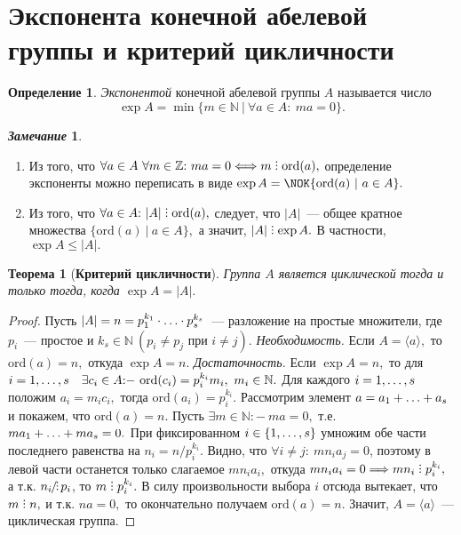 \documentclass[a4paper, 14pt]{extarticle}
\newcommand{\integers}{\mathbb{Z}}
\newcommand{\naturals}{\mathbb{N}}
\newcommand{\ord}{\mathrm{ord}}
\newcommand{\suchthat}{{:}{-} \ }
\DeclareRobustCommand{\divby}{%
	\mathrel{\text{\vbox{\baselineskip.65ex\lineskiplimit0pt\hbox{.}\hbox{.}\hbox{.}}}}%
}
\DeclareRobustCommand{\ndivby}{%
	\mathrel{\text{%
			\vbox{\baselineskip.65ex\lineskiplimit0pt\hbox{.}\hbox{.}\hbox{.}}%
			\kern-1.5ex\hbox{/}%
	}}%
}
\theoremstyle{definition}
\newtheorem*{remark}{\textit{Замечание}}
\newtheorem*{definition*}{Определение}
\theoremstyle{plain}
\newtheorem*{theorem*}{Теорема}
\numberwithin{theorem}{section}
\numberwithin{definition}{section}
\numberwithin{statement}{section}
\numberwithin{lemma}{section}
\numberwithin{consequence}{section}
\begin{document}
	\section{Экспонента конечной абелевой группы и критерий цикличности}
		\begin{definition*}
			\textit{Экспонентой} конечной абелевой группы $A$ называется число
			\begin{equation*}
				\exp A =\min \{m \in \naturals \ | \ \forall a \in A{:} \ ma = 0\}.
			\end{equation*}
		\end{definition*}
		\begin{remark}
			\
			\begin{enumerate}
				\setlength\itemsep{0.1em}
				\item Из того, что ${\forall a \in A \  \forall m \in \integers{:} \ ma = 0 \Longleftrightarrow m \divby \ord(a),}$ определение экспоненты можно переписать в виде ${\exp A = \NOK \{\ord(a) \ | \ a \in A\}.}$
				\item Из того, что ${\forall a \in A{:} \ |A| \divby \ord(a),}$ следует, что $|A|$~--- общее кратное
				множества ${\{\ord(a) \ | \ a \in A\},}$ а значит, ${|A| \divby \exp A.}$ В частности,
				${\exp A \leqslant |A|.}$
			\end{enumerate}
		\end{remark}
		\begin{theorem*}[\textbf{Критерий цикличности}]
			Группа $A$ является циклической тогда и только тогда, когда ${\exp A = |A|.}$
		\end{theorem*}
		\begin{proof}
			Пусть ${|A| = n = p^{k_1}_1 \cdot \mathellipsis \cdot p^{k_s}_s}$~--- разложение на простые множители, где $p_i$~--- простое и ${k_s \in \naturals \ (p_i \neq p_j \text{ при } i \neq j).}$ \newline
			{\textit{Необходимость.}} Если ${A = \langle a \rangle,}$ то ${\ord (a) = n,}$ откуда ${\exp A = n.}$ \newline
			{\textit{Достаточность.}} Если ${\exp A = n,}$ то для ${i = 1, \mathellipsis, s \quad \exists c_i \in A \suchthat \ord(c_i) = p^{k_i}_i m_i, \ m_i \in \naturals.}$ Для каждого ${i = 1, \mathellipsis, s}$ положим ${a_i = m_i c_i,}$ тогда ${\ord(a_i) = p^{k_i}_i.}$ Рассмотрим элемент ${a = a_1 + \mathellipsis + a_s}$ и покажем, что ${\ord(a) = n.}$ Пусть ${\exists m \in \naturals \suchthat ma = 0,}$ т.е. ${ma_1 + \mathellipsis + ma_s = 0.}$ При фиксированном ${i \in \{1, \mathellipsis, s\}}$ умножим обе части последнего равенства на ${n_i = n/p^{k_i}_i.}$ Видно, что ${\forall i \neq j{:} \ mn_ia_j = 0}$, поэтому в левой части останется только слагаемое ${mn_ia_i,}$ откуда ${mn_ia_i = 0 \Longrightarrow mn_i \divby p^{k_i}_i,}$ а т.к. 
			${n_i \ndivby p_i}$, то ${m \divby p^{k_i}_i.}$  В силу произвольности выбора $i$ отсюда вытекает, что ${m \divby n,}$ и т.к. ${na = 0,}$ то окончательно получаем ${\ord(a) = n.}$ Значит, ${A = \langle a \rangle}$~--- циклическая группа.
		\end{proof}
	\newpage
\end{document}
